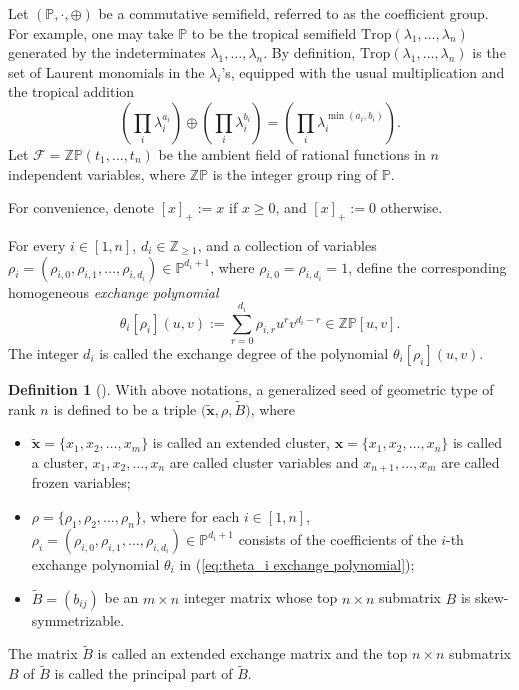 \documentclass[11pt, reqno]{amsart}
\theoremstyle{plain}
\theoremstyle{definition}
\newtheorem{definition}[theorem]{Definition}
\numberwithin{equation}{section}
\newcommand{\ZZ}{{\mathbb {Z}}}
\begin{document}
 
Let $(\mathbb{P},\cdot,\oplus)$ be a commutative semifield, referred to as the coefficient group. For example, one may take $\mathbb{P}$ to be the tropical semifield $\mathrm{Trop}(\lambda_1,\dots,\lambda_n)$ generated by the indeterminates $\lambda_1,\dots,\lambda_n$. By definition, $\mathrm{Trop}(\lambda_1,\dots,\lambda_n)$ is the set of Laurent monomials in the $\lambda_i$'s, equipped with the usual multiplication and the tropical addition
 \begin{equation*}
\left(\displaystyle\prod_i \lambda_i^{a_i}\right) \oplus \left(\displaystyle\prod_i \lambda_i^{b_i}\right) = \left(\displaystyle\prod_i \lambda_i^{\min(a_i,b_i)}\right).
 \end{equation*}
Let $\mathcal{F}=\mathbb{ZP}(t_1,\dots,t_n)$ be the ambient field of rational functions in $n$ independent variables, where $\mathbb{ZP}$ is the integer group ring of $\mathbb{P}$.

For convenience, denote $[x]_+:=x$ if $x \geq 0$, and $[x]_+:=0$ otherwise.

For every $i \in [1,n]$, $d_i \in \ZZ_{\ge 1}$, and a collection of variables $\rho_i=(\rho_{i,0}, \rho_{i,1},\dots, \rho_{i,d_i})\in\mathbb{P}^{d_i+1}$, where $\rho_{i,0}=\rho_{i,d_i}=1$, define the corresponding homogeneous \emph{exchange polynomial}
\begin{equation} \label{eq:theta_i exchange polynomial}
\theta_i[\rho_i](u,v) := \displaystyle \sum_{r=0}^{d_i} \rho_{i,r} u^r v^{d_i-r}\in\mathbb{ZP} [u,v].
\end{equation}
The integer $d_i$ is called the exchange degree of the polynomial $\theta_i[\rho_i](u,v)$.  

\begin{definition}[{\cite[Definition 2.1]{CS14}}] \label{def of generalized seed}
With above notations, a generalized seed of geometric type of rank $n$ is defined to be a triple $\big(\widetilde{\mathbf{x}},\rho,\widetilde{B}\big)$, where  
\begin{itemize}
\item[(1)] $\widetilde{\mathbf{x}}=\{x_{1},x_2,\ldots, x_{m}\}$ is called an extended cluster, $\mathbf{x}=\{x_{1},x_2,\ldots,x_{n}\}$ is called a cluster, $x_1, x_2, \ldots,x_{n}$ are called cluster variables and $x_{n+1},\ldots,x_{m}$ are called frozen variables;
  
\item[(2)] $\rho=\{\rho_{1},\rho_2,\ldots,\rho_{n}\}$, where for each $i\in[1,n]$, $\rho_i=(\rho_{i,0},\rho_{i,1},\dots,\rho_{i,d_i}) \in\mathbb{P}^{d_i+1}$ consists of the coefficients of the $i$-th exchange polynomial $\theta_i$ in (\ref{eq:theta_i exchange polynomial});
 
\item[(3)] $\widetilde{B}=(b_{ij})$ be an $m\times n$ integer matrix whose top $n\times n$ submatrix $B$ is skew-symmetrizable. 
\end{itemize}
\end{definition}
The matrix $\widetilde{B}$ is called an extended exchange matrix and the top $n\times n$ submatrix $B$ of $\widetilde{B}$ is called the principal part of $\widetilde{B}$. 
\end{document}
